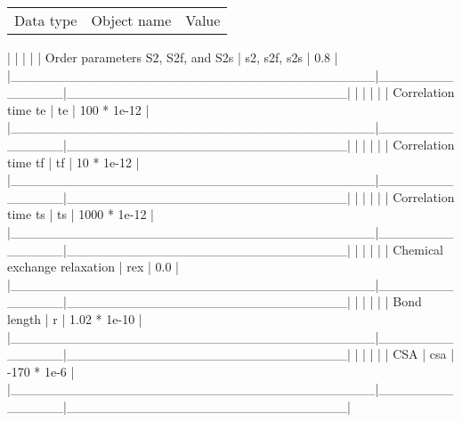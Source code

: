 \begin{tabular}{ccc}
Data type & Object name & Value \\
\end{tabular}
|                                       |              |                              |
| Order parameters S2, S2f, and S2s     | s2, s2f, s2s | 0.8                          |
|\_\_\_\_\_\_\_\_\_\_\_\_\_\_\_\_\_\_\_\_\_\_\_\_\_\_\_\_\_\_\_\_\_\_\_\_\_\_\_|\_\_\_\_\_\_\_\_\_\_\_\_\_\_|\_\_\_\_\_\_\_\_\_\_\_\_\_\_\_\_\_\_\_\_\_\_\_\_\_\_\_\_\_\_|
|                                       |              |                              |
| Correlation time te                   | te           | 100 * 1e-12                  |
|\_\_\_\_\_\_\_\_\_\_\_\_\_\_\_\_\_\_\_\_\_\_\_\_\_\_\_\_\_\_\_\_\_\_\_\_\_\_\_|\_\_\_\_\_\_\_\_\_\_\_\_\_\_|\_\_\_\_\_\_\_\_\_\_\_\_\_\_\_\_\_\_\_\_\_\_\_\_\_\_\_\_\_\_|
|                                       |              |                              |
| Correlation time tf                   | tf           | 10 * 1e-12                   |
|\_\_\_\_\_\_\_\_\_\_\_\_\_\_\_\_\_\_\_\_\_\_\_\_\_\_\_\_\_\_\_\_\_\_\_\_\_\_\_|\_\_\_\_\_\_\_\_\_\_\_\_\_\_|\_\_\_\_\_\_\_\_\_\_\_\_\_\_\_\_\_\_\_\_\_\_\_\_\_\_\_\_\_\_|
|                                       |              |                              |
| Correlation time ts                   | ts           | 1000 * 1e-12                 |
|\_\_\_\_\_\_\_\_\_\_\_\_\_\_\_\_\_\_\_\_\_\_\_\_\_\_\_\_\_\_\_\_\_\_\_\_\_\_\_|\_\_\_\_\_\_\_\_\_\_\_\_\_\_|\_\_\_\_\_\_\_\_\_\_\_\_\_\_\_\_\_\_\_\_\_\_\_\_\_\_\_\_\_\_|
|                                       |              |                              |
| Chemical exchange relaxation          | rex          | 0.0                          |
|\_\_\_\_\_\_\_\_\_\_\_\_\_\_\_\_\_\_\_\_\_\_\_\_\_\_\_\_\_\_\_\_\_\_\_\_\_\_\_|\_\_\_\_\_\_\_\_\_\_\_\_\_\_|\_\_\_\_\_\_\_\_\_\_\_\_\_\_\_\_\_\_\_\_\_\_\_\_\_\_\_\_\_\_|
|                                       |              |                              |
| Bond length                           | r            | 1.02 * 1e-10                 |
|\_\_\_\_\_\_\_\_\_\_\_\_\_\_\_\_\_\_\_\_\_\_\_\_\_\_\_\_\_\_\_\_\_\_\_\_\_\_\_|\_\_\_\_\_\_\_\_\_\_\_\_\_\_|\_\_\_\_\_\_\_\_\_\_\_\_\_\_\_\_\_\_\_\_\_\_\_\_\_\_\_\_\_\_|
|                                       |              |                              |
| CSA                                   | csa          | -170 * 1e-6                  |
|\_\_\_\_\_\_\_\_\_\_\_\_\_\_\_\_\_\_\_\_\_\_\_\_\_\_\_\_\_\_\_\_\_\_\_\_\_\_\_|\_\_\_\_\_\_\_\_\_\_\_\_\_\_|\_\_\_\_\_\_\_\_\_\_\_\_\_\_\_\_\_\_\_\_\_\_\_\_\_\_\_\_\_\_|




